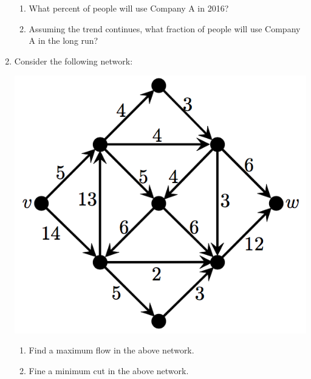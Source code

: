 \documentclass{article}
\begin{document}
\begin{enumerate}
\begin{enumerate}
		\item What percent of people will use Company A in 2016?

		\item Assuming the trend continues, what fraction of people will use Company A in the long run?
	\end{enumerate}

\pagebreak

	\item Consider the following network:
	\begin{center}
	\includegraphics[width=.4\textwidth]{pic6.png}
	\end{center}	

	\begin{enumerate}
		\item Find a maximum flow in the above network.
		\item Fine a minimum cut in the above network.
	\end{enumerate}




	


\end{enumerate}
\end{document}

